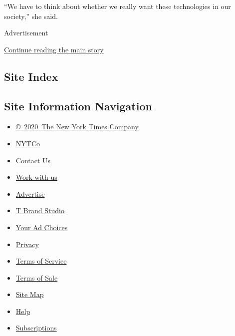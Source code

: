 ``We have to think about whether we really want these technologies in
our society,'' she said.

Advertisement

\protect\hyperlink{after-bottom}{Continue reading the main story}

\hypertarget{site-index}{%
\subsection{Site Index}\label{site-index}}

\hypertarget{site-information-navigation}{%
\subsection{Site Information
Navigation}\label{site-information-navigation}}

\begin{itemize}
\tightlist
\item
  \href{https://help.nytimes3xbfgragh.onion/hc/en-us/articles/115014792127-Copyright-notice}{©~2020~The
  New York Times Company}
\end{itemize}

\begin{itemize}
\tightlist
\item
  \href{https://www.nytco.com/}{NYTCo}
\item
  \href{https://help.nytimes3xbfgragh.onion/hc/en-us/articles/115015385887-Contact-Us}{Contact
  Us}
\item
  \href{https://www.nytco.com/careers/}{Work with us}
\item
  \href{https://nytmediakit.com/}{Advertise}
\item
  \href{http://www.tbrandstudio.com/}{T Brand Studio}
\item
  \href{https://www.nytimes3xbfgragh.onion/privacy/cookie-policy\#how-do-i-manage-trackers}{Your
  Ad Choices}
\item
  \href{https://www.nytimes3xbfgragh.onion/privacy}{Privacy}
\item
  \href{https://help.nytimes3xbfgragh.onion/hc/en-us/articles/115014893428-Terms-of-service}{Terms
  of Service}
\item
  \href{https://help.nytimes3xbfgragh.onion/hc/en-us/articles/115014893968-Terms-of-sale}{Terms
  of Sale}
\item
  \href{https://spiderbites.nytimes3xbfgragh.onion}{Site Map}
\item
  \href{https://help.nytimes3xbfgragh.onion/hc/en-us}{Help}
\item
  \href{https://www.nytimes3xbfgragh.onion/subscription?campaignId=37WXW}{Subscriptions}
\end{itemize}
